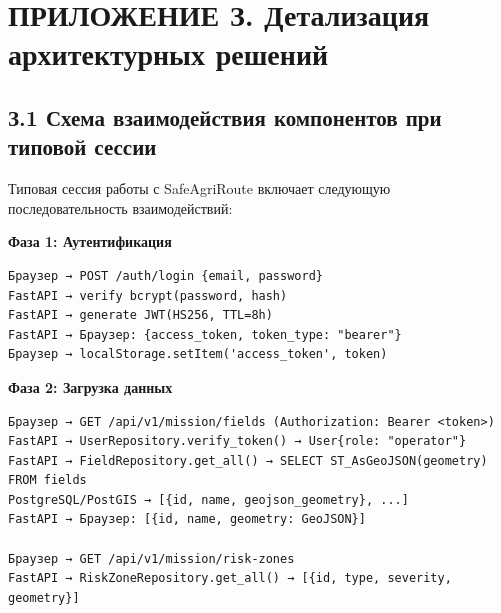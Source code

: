 \documentclass[14pt,a4paper]{extarticle}
\begin{document}
\hypertarget{ux43fux440ux438ux43bux43eux436ux435ux43dux438ux435-ux437.-ux434ux435ux442ux430ux43bux438ux437ux430ux446ux438ux44f-ux430ux440ux445ux438ux442ux435ux43aux442ux443ux440ux43dux44bux445-ux440ux435ux448ux435ux43dux438ux439}{%
\section{ПРИЛОЖЕНИЕ З. Детализация архитектурных решений}\label{ux43fux440ux438ux43bux43eux436ux435ux43dux438ux435-ux437.-ux434ux435ux442ux430ux43bux438ux437ux430ux446ux438ux44f-ux430ux440ux445ux438ux442ux435ux43aux442ux443ux440ux43dux44bux445-ux440ux435ux448ux435ux43dux438ux439}}

\hypertarget{ux437.1-ux441ux445ux435ux43cux430-ux432ux437ux430ux438ux43cux43eux434ux435ux439ux441ux442ux432ux438ux44f-ux43aux43eux43cux43fux43eux43dux435ux43dux442ux43eux432-ux43fux440ux438-ux442ux438ux43fux43eux432ux43eux439-ux441ux435ux441ux441ux438ux438}{%
\subsection{З.1 Схема взаимодействия компонентов при типовой сессии}\label{ux437.1-ux441ux445ux435ux43cux430-ux432ux437ux430ux438ux43cux43eux434ux435ux439ux441ux442ux432ux438ux44f-ux43aux43eux43cux43fux43eux43dux435ux43dux442ux43eux432-ux43fux440ux438-ux442ux438ux43fux43eux432ux43eux439-ux441ux435ux441ux441ux438ux438}}

Типовая сессия работы с SafeAgriRoute включает следующую последовательность взаимодействий:

\textbf{Фаза 1: Аутентификация}

\begin{verbatim}
Браузер → POST /auth/login {email, password}
FastAPI → verify bcrypt(password, hash)
FastAPI → generate JWT(HS256, TTL=8h)
FastAPI → Браузер: {access_token, token_type: "bearer"}
Браузер → localStorage.setItem('access_token', token)
\end{verbatim}

\textbf{Фаза 2: Загрузка данных}

\begin{verbatim}
Браузер → GET /api/v1/mission/fields (Authorization: Bearer <token>)
FastAPI → UserRepository.verify_token() → User{role: "operator"}
FastAPI → FieldRepository.get_all() → SELECT ST_AsGeoJSON(geometry) FROM fields
PostgreSQL/PostGIS → [{id, name, geojson_geometry}, ...]
FastAPI → Браузер: [{id, name, geometry: GeoJSON}]

Браузер → GET /api/v1/mission/risk-zones
FastAPI → RiskZoneRepository.get_all() → [{id, type, severity, geometry}]
\end{verbatim}
\end{document}
